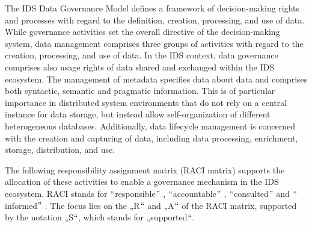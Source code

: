 The IDS Data Governance Model defines a framework of decision-making rights and processes with regard to the definition, creation, processing, and use of data. While governance activities set the overall directive of the decision-making system, data management comprises three groups of activities with regard to the creation, processing, and use of data. In the IDS context, data governance comprises also usage rights of data shared and exchanged within the IDS ecosystem. The management of metadata specifies data about data and comprises both syntactic, semantic and pragmatic information. This is of particular importance in distributed system environments that do not rely on a central instance for data storage, but instead allow self-organization of different heterogeneous databases. Additionally, data lifecycle management is concerned with the creation and capturing of data, including data processing, enrichment, storage, distribution, and use.

The following responsibility assignment matrix (RACI matrix) supports the allocation of these activities to enable a governance mechanism in the IDS ecosystem. RACI stands for $``$responsible$"$ , $``$accountable$"$ , $``$consulted$"$  and $``$informed$"$ . The focus lies on the „R$``$ and „A$``$ of the RACI matrix, supported by the notation „S$``$, which stands for „supported$``$. 




